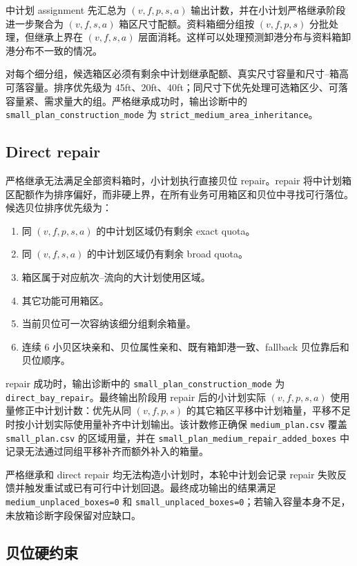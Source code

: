 \documentclass[UTF8,a4paper,11pt]{ctexart}
\newcommand{\code}[1]{\nolinkurl{#1}}
\begin{document}
中计划 assignment 先汇总为 \((v,f,p,s,a)\) 输出计数，并在小计划严格继承阶段进一步聚合为 \((v,f,s,a)\) 箱区尺寸配额。资料箱细分组按 \((v,f,p,s)\) 分批处理，但继承上界在 \((v,f,s,a)\) 层面消耗。这样可以处理预测卸港分布与资料箱卸港分布不一致的情况。

对每个细分组，候选箱区必须有剩余中计划继承配额、真实尺寸容量和尺寸--箱高可落容量。排序优先级为 45ft、20ft、40ft；同尺寸下优先处理可选箱区少、可落容量紧、需求量大的组。严格继承成功时，输出诊断中的 \code{small_plan_construction_mode} 为 \code{strict_medium_area_inheritance}。

\subsection{Direct repair}

严格继承无法满足全部资料箱时，小计划执行直接贝位 repair。repair 将中计划箱区配额作为排序偏好，而非硬上界，在所有业务可用箱区和贝位中寻找可行落位。候选贝位排序优先级为：
\begin{enumerate}
  \item 同 \((v,f,p,s,a)\) 的中计划区域仍有剩余 exact quota。
  \item 同 \((v,f,s,a)\) 的中计划区域仍有剩余 broad quota。
  \item 箱区属于对应航次--流向的大计划使用区域。
  \item 其它功能可用箱区。
  \item 当前贝位可一次容纳该细分组剩余箱量。
  \item 连续 6 小贝区块亲和、贝位属性亲和、既有箱卸港一致、fallback 贝位靠后和贝位顺序。
\end{enumerate}

repair 成功时，输出诊断中的 \code{small_plan_construction_mode} 为 \code{direct_bay_repair}。最终输出阶段用 repair 后的小计划实际 \((v,f,p,s,a)\) 使用量修正中计划计数：优先从同 \((v,f,p,s)\) 的其它箱区平移中计划箱量，平移不足时按小计划实际使用量补齐中计划输出。该计数修正确保 \code{medium_plan.csv} 覆盖 \code{small_plan.csv} 的区域用量，并在 \code{small_plan_medium_repair_added_boxes} 中记录无法通过同组平移补齐而额外补入的箱量。

严格继承和 direct repair 均无法构造小计划时，本轮中计划会记录 repair 失败反馈并触发重试或已有可行中计划回退。最终成功输出的结果满足 \code{medium_unplaced_boxes=0} 和 \code{small_unplaced_boxes=0}；若输入容量本身不足，未放箱诊断字段保留对应缺口。

\subsection{贝位硬约束}
\end{document}
